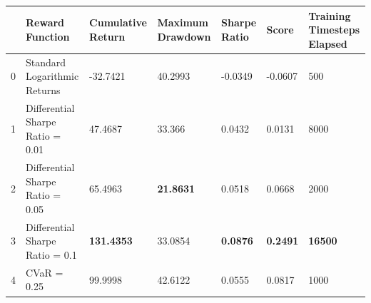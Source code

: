 \begin{tabular}{lllllll}
\toprule
 & Reward Function & Cumulative Return & Maximum Drawdown & Sharpe Ratio & Score & Training Timesteps Elapsed \\
\midrule
0 & Standard Logarithmic Returns & -32.7421 & 40.2993 & -0.0349 & -0.0607 & 500 \\
1 & Differential Sharpe Ratio = 0.01 & 47.4687 & 33.366 & 0.0432 & 0.0131 & 8000 \\
2 & Differential Sharpe Ratio = 0.05 & 65.4963 & \textbf{21.8631} & 0.0518 & 0.0668 & 2000 \\
3 & Differential Sharpe Ratio = 0.1 & \textbf{131.4353} & 33.0854 & \textbf{0.0876} & \textbf{0.2491} & \textbf{16500} \\
4 & CVaR = 0.25 & 99.9998 & 42.6122 & 0.0555 & 0.0817 & 1000 \\
\bottomrule
\end{tabular}

